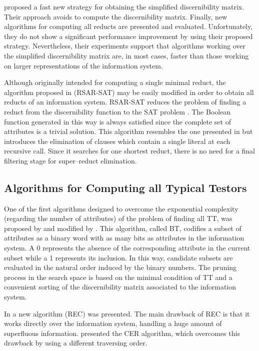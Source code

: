 \documentclass[authoryear,preprint,review,12pt]{elsarticle}
\begin{document}
  \cite{Chen2012} proposed a fast new strategy for obtaining the simplified discernibility matrix. Their approach avoids to compute the discernibility matrix. Finally, new algorithms for computing all reducts are presented and evaluated. Unfortunately, they do not show a significant performance improvement by using their proposed strategy. Nevertheless, their experiments support that algorithms working over the simplified discernibility matrix are, in most cases, faster than those working on larger representations of the information system.
  
  Although originally intended for computing a single minimal reduct, the algorithm proposed in \citep{Jensen14} (RSAR-SAT) may be easily modified in order to obtain all reducts of an information system. RSAR-SAT reduces the problem of finding a reduct from the discernibility function to the SAT problem \citep{Davis62}. The Boolean function generated in this way is always satisfied since the complete set of attributes is a trivial solution. This algorithm resembles the one presented in \citep{Starzyk99} but introduces the elimination of clauses which contain a single literal at each recursive call. Since it searches for one shortest reduct, there is no need for a final filtering stage for super--reduct elimination.

\subsection{Algorithms for Computing all Typical Testors}
  One of the first algorithms designed to overcome the exponential complexity (regarding the number of attributes)
  of the problem of finding all TT, was proposed by \cite{Ruiz85} and modified by \cite{sanchez02}. This algorithm, called BT, codifies a subset of attributes as a binary word with as many bits as attributes in the information system. A 0 represents the absence of the corresponding attribute in the current subset while a 1 represents its inclusion. In this way, candidate subsets are evaluated in the natural order induced by the binary numbers. The pruning process in the search space is based on the minimal condition of TT and a convenient sorting of the discernibility matrix associated to the information system. 
  
  In \citep{Shulcloper95b} a new algorithm (REC) was presented.
  The main drawback of REC is that it works directly over the information system, handling a huge amount of superfluous
  information. \cite{Ayaquica97} presented the CER algorithm, which overcomes this drawback by using a different
  traversing order.  
  
\end{document}
